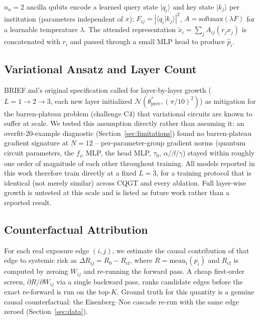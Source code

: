 \documentclass[journal]{IEEEtran}
\begin{document}
$n_a=2$ ancilla qubits encode a learned query state $\lvert q_i\rangle$
and key state $\lvert k_j \rangle$ per institution (parameters
independent of $x$); $F_{ij} = |\langle q_i \vert k_j \rangle|^2$,
$A = \mathrm{softmax}(\lambda F)$ for a learnable temperature $\lambda$.
The attended representation $\tilde x_i = \sum_j A_{ij} (r_j x_j)$ is
concatenated with $r_i$ and passed through a small MLP head to produce
$\hat p_i$.

\subsection{Variational Ansatz and Layer Count}
\label{sec:ansatz}

BRIEF.md's original specification called for layer-by-layer growth
($L=1 \to 2 \to 3$, each new layer initialized $\mathcal
N(\theta^*_{\text{prev}}, (\pi/10)^2)$) as mitigation for the barren-plateau
problem (challenge C4) that variational circuits are known to suffer at
scale. We tested this assumption directly rather than assuming it: an
overfit-20-example diagnostic (Section~\ref{sec:limitations}) found no
barren-plateau gradient signature at $N=12$ -- per-parameter-group
gradient norms (quantum circuit parameters, the $f_\psi$ MLP, the head
MLP, $\tau_0$, $\alpha/\beta/\gamma$) stayed within roughly one order of
magnitude of each other throughout training. All models reported in this
work therefore train directly at a fixed $L=3$, for a training protocol
that is identical (not merely similar) across CQGT and every ablation.
Full layer-wise growth is untested at this scale and is listed as future
work rather than a reported result.

\subsection{Counterfactual Attribution}
\label{sec:counterfactual}

For each real exposure edge $(i,j)$, we estimate the causal contribution
of that edge to systemic risk as $\Delta R_{ij} = R_0 - R_{\mathrm{cf}}$,
where $R = \mathrm{mean}_i(\hat p_i)$ and $R_{\mathrm{cf}}$ is computed by
zeroing $W_{ij}$ and re-running the forward pass. A cheap first-order
screen, $\partial R/\partial W_{ij}$ via a single backward pass, ranks
candidate edges before the exact re-forward is run on the top-$K$.
Ground truth for this quantity is a genuine causal counterfactual: the
Eisenberg--Noe cascade re-run with the same edge zeroed
(Section~\ref{sec:data}).
\end{document}
